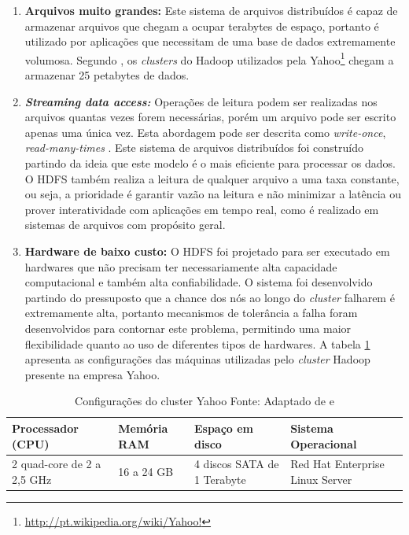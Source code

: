 \begin{enumerate}

\item \textbf{Arquivos muito grandes:} Este sistema de arquivos distribuídos é capaz de armazenar arquivos que chegam a ocupar terabytes de espaço, portanto é utilizado por aplicações que necessitam de uma base de dados extremamente volumosa. Segundo , os \textit{clusters} do Hadoop utilizados pela Yahoo\footnote{\url{http://pt.wikipedia.org/wiki/Yahoo!}} chegam a armazenar 25 petabytes de dados.

\item \textit{\textbf{Streaming data access:}} Operações de leitura podem ser realizadas nos arquivos quantas vezes forem necessárias, porém um arquivo pode ser escrito apenas uma única vez. Esta abordagem pode ser descrita como \textit{write-once}, \textit{read-many-times} \cite{white2012}. Este sistema de arquivos distribuídos foi construído partindo da ideia que este modelo é o mais eficiente para processar os dados. O HDFS também realiza a leitura de qualquer arquivo a uma taxa constante, ou seja, a prioridade é garantir vazão na leitura e não minimizar a latência ou prover interatividade com aplicações em tempo real, como é realizado em sistemas de arquivos com propósito geral.

\item \textbf{Hardware de baixo custo:} O HDFS foi projetado para ser executado em hardwares que não precisam ter necessariamente alta capacidade computacional e também alta confiabilidade. O sistema foi desenvolvido partindo do pressuposto que a chance dos nós ao longo do \textit{cluster} falharem é extremamente alta, portanto mecanismos de tolerância a falha foram desenvolvidos para contornar este problema, permitindo uma maior flexibilidade quanto ao uso de diferentes tipos de hardwares. A tabela \ref{tab-hardware} apresenta as configurações das máquinas utilizadas pelo \textit{cluster} Hadoop presente na empresa Yahoo.

\end{enumerate}

\begin{table}[!ht]
\begin{center}
  \begin{tabular}{|p{3cm}|p{2cm}|p{3cm}|p{4cm}|}
	\hline
	Processador (CPU) & Memória RAM  & Espaço em disco & Sistema Operacional
	\\ \hline
	2 quad-core de 2 a 2,5 GHz & 16 a 24 GB & 4 discos SATA de 1 Terabyte & Red Hat Enterprise Linux Server
	\\ \hline
  \end{tabular}
  \captionsetup{justification=centering}
  \caption[Configurações do cluster Yahoo]{Configurações do cluster Yahoo
  \protect\linebreak Fonte: Adaptado de \cite{white2012} e \cite{shvachko2010}}
\label{tab-hardware}
\end{center}
\end{table}
\FloatBarrier

